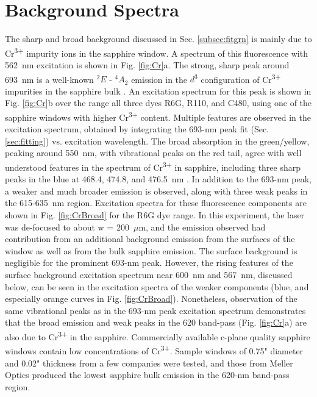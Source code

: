 \section{Background Spectra}
\label{sec:bgs} %

The sharp and broad background discussed in Sec. \ref{subsec:fitgrn} is mainly due to Cr\textsuperscript{3+} impurity ions in the sapphire window.  A spectrum of this fluorescence with 562~nm excitation is shown in Fig. \ref{fig:Cr}a.  The strong, sharp peak around 693~nm is a well-known $^{2}E$ - $^{4}A_{2}$ emission in the $d^{3}$ configuration of Cr\textsuperscript{3+} impurities in the sapphire bulk \cite{SapphireRlines1964,SapphireRlines2010}.  An excitation spectrum for this peak is shown in Fig. \ref{fig:Cr}b over the range all three dyes R6G, R110, and C480, using one of the sapphire windows with higher Cr\textsuperscript{3+} content.  Multiple features are observed in the excitation spectrum, obtained by integrating the 693-nm peak fit (Sec. \ref{sec:fitting}) vs. excitation wavelength.  The broad absorption in the green/yellow, peaking around 550~nm, with vibrational peaks on the red tail, agree with well understood features in the spectrum of Cr\textsuperscript{3+} in sapphire, including three sharp peaks in the blue at 468.4, 474.8, and 476.5~nm \cite{SapphireFord,SapphireMcclure}.  In addition to the 693-nm peak, a weaker and much broader emission is observed, along with three weak peaks in the 615-635~nm region.  Excitation spectra for these fluorescence components are shown in Fig. \ref{fig:CrBroad} for the R6G dye range.  In this experiment, the laser was de-focused to about w = 200~$\mu$m, and the emission observed had contribution from an additional background emission from the surfaces of the window as well as from the bulk sapphire emission.  The surface background is negligible for the prominent 693-nm peak.  However, the rising features of the surface background excitation spectrum near 600~nm and 567~nm, discussed below, can be seen in the excitation spectra of the weaker components (blue, and especially orange curves in Fig. \ref{fig:CrBroad}).  Nonetheless, observation of the same vibrational peaks as in the 693-nm peak excitation spectrum demonstrates that the broad emission and weak peaks in the 620 band-pass (Fig. \ref{fig:Cr}a) are also due to Cr\textsuperscript{3+} in the sapphire.  Commercially available c-plane quality sapphire windows contain low concentrations of Cr\textsuperscript{3+}.  Sample windows of 0.75" diameter and 0.02" thickness from a few companies were tested, and those from Meller Optics produced the lowest sapphire bulk emission in the 620-nm band-pass region.

